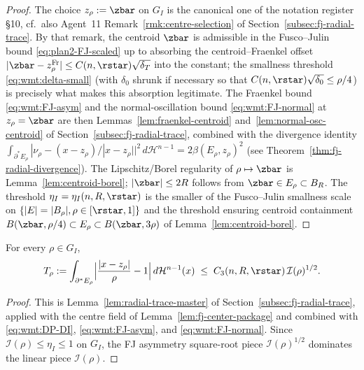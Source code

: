 \begin{proof}
The choice $z_\rho:=\zbar$ on $G_I$ is the canonical one of the
notation register \S10, cf.\ also Agent~11
Remark~\ref{rmk:centre-selection} of
Section~\ref{subsec:fj-radial-trace}. By that remark, the centroid
$\zbar$ is admissible in the Fusco--Julin bound \eqref{eq:plan2-FJ-scaled}
up to absorbing the centroid--Fraenkel offset
$|\zbar-z^{\mathrm{Fr}}_\rho|\le C(n,\rstar)\sqrt{\delta_T}$ into the
constant; the smallness threshold \eqref{eq:wmt:delta-small} (with
$\delta_0$ shrunk if necessary so that
$C(n,\rstar)\sqrt{\delta_0}\le\rho/4$) is precisely what makes this
absorption legitimate. The Fraenkel bound
\eqref{eq:wmt:FJ-asym} and the normal-oscillation bound
\eqref{eq:wmt:FJ-normal} at $z_\rho=\zbar$ are then
Lemmas~\ref{lem:fraenkel-centroid} and~\ref{lem:normal-osc-centroid}
of Section~\ref{subsec:fj-radial-trace}, combined with the divergence
identity \(\int_{\partial^*E_\rho}|\nu_\rho-(x-z_\rho)/|x-z_\rho||^2\,
d\mathcal H^{n-1}=2\beta(E_\rho,z_\rho)^2\) (see
Theorem~\ref{thm:fj-radial-divergence}). The Lipschitz/Borel
regularity of $\rho\mapsto\zbar$ is Lemma~\ref{lem:centroid-borel};
$|\zbar|\le 2R$ follows from $\zbar\in E_\rho\subset B_R$. The
threshold $\eta_I=\eta_I(n,R,\rstar)$ is the smaller of the
Fusco--Julin smallness scale on $\{|E|=|B_\rho|,\rho\in[\rstar,1]\}$
and the threshold ensuring centroid containment
\(B(\zbar,\rho/4)\subset E_\rho\subset B(\zbar,3\rho)\) of
Lemma~\ref{lem:centroid-borel}.
\end{proof}

\begin{lemma}
\label{lem:wmt:radial-trace}
For every $\rho\in G_I$,
\begin{equation}\label{eq:wmt:radial-trace}
   T_\rho:=\int_{\partial^*E_\rho}
      \Bigl|\frac{|x-z_\rho|}{\rho}-1\Bigr|\,d\mathcal H^{n-1}(x)
   \;\le\; C_3(n,R,\rstar)\,\mathcal I(\rho)^{1/2}.
\end{equation}
\end{lemma}

\begin{proof}
This is Lemma~\ref{lem:radial-trace-master} of
Section~\ref{subsec:fj-radial-trace}, applied with the centre field of
Lemma~\ref{lem:fj-center-package} and combined with
\eqref{eq:wmt:DP-DI}, \eqref{eq:wmt:FJ-asym}, and
\eqref{eq:wmt:FJ-normal}. Since $\mathcal I(\rho)\le\eta_I\le 1$ on
$G_I$, the FJ asymmetry square-root piece $\mathcal I(\rho)^{1/2}$
dominates the linear piece $\mathcal I(\rho)$.
\end{proof}

